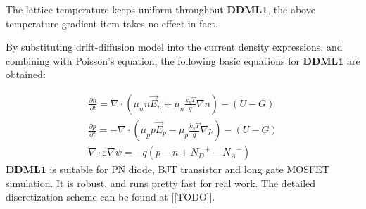 \documentclass[oneside,12pt]{cgd_book}
\begin{document}
The lattice temperature keeps uniform throughout $\mathbf{DDML1}$, the above temperature
      gradient item takes no effect in fact.
\par
By substituting drift-diffusion model into the current density expressions, and combining with Poisson's
      equation, the following basic equations for $\mathbf{DDML1}$
are obtained:
\par
\begin{subequations}
\begin{align}
 \frac{\partial n}{\partial t}  = \nabla \cdot \left (\mu_n n \vec{E}_n + \mu_n\frac{k_b T}{q}\nabla n \right
        ) - (U - G) \\
 \frac{\partial p}{\partial t}  = -\nabla \cdot \left (\mu_p p\vec{E}_p - \mu_p\frac{k_b T}{q}\nabla p \right
        ) - (U - G)  \\
 \nabla \cdot \varepsilon \nabla \psi  = - q(p - n + {N_D}^{+} - {N_A}^{-} )
\end{align}
\end{subequations}
$\mathbf{DDML1}$ is suitable for PN diode, BJT transistor and long gate MOSFET simulation. It is
      robust, and runs pretty fast for real work. The detailed discretization scheme can be found at [[TODO]].
\par
\end{document}

